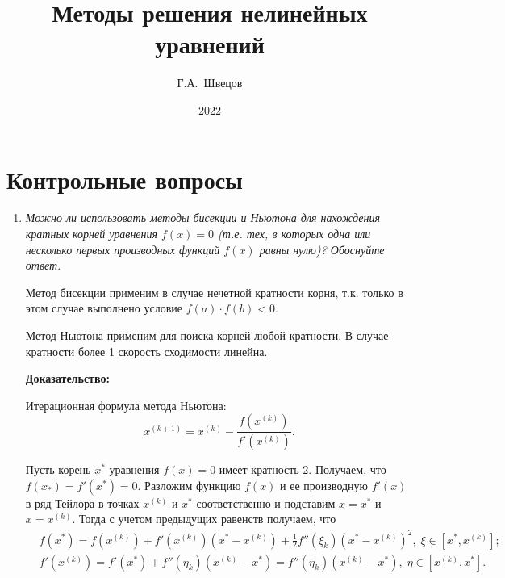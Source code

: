 \documentclass[12pt, a4paper]{article}
\title{Методы решения нелинейных уравнений}
\author{Г.А.~Швецов}
\date{2022}
\begin{document}
	\newcommand{\pl}{\partial}
	\maketitle
	
	\tableofcontents
	
	\newpage
	
	\section{Контрольные вопросы}
	\begin{enumerate}
		\item \textit{Можно ли использовать методы бисекции и Ньютона для нахождения кратных корней уравнения $f (x) = 0$ (т.е. тех, в которых одна или несколько первых производных функций $f (x)$ равны нулю)? Обоснуйте ответ.}
		\smallskip
		
		Метод бисекции применим в случае нечетной кратности корня, т.к. только в этом случае выполнено условие $f(a) \cdot f(b)<0$.
				
			Метод Ньютона применим для поиска корней любой кратности. В случае кратности более 1 скорость сходимости линейна.
		
		\textbf{Доказательство:}
		
		Итерационная формула метода Ньютона:
	\begin{equation}
		\label{Newton}
		x^{(k+1)} = x^{(k)} - \dfrac{f(x^{(k)})}{f'(x^{(k)})}.
	\end{equation}
	
	Пусть корень $x^*$ уравнения $f(x)=0$ имеет кратность 2. Получаем, что $f(x_*) = f'(x^*) = 0$. Разложим функцию $f(x)$ и ее производную $f'(x)$ в ряд Тейлора в точках $x^{(k)}$ и $x^*$ соответственно и подставим $x = x^*$ и $x = x^{(k)}$. Тогда с учетом предыдущих равенств получаем, что
	\begin{eqnarray}
		\label{eq1}
		& f(x^*) = f(x^{(k)}) + f'(x^{(k)}) (x^*-x^{(k)}) + \frac12 f''(\xi_k) (x^*-x^{(k)})^2,\; \xi \in [x^*, x^{(k)}]; \\
		\label{eq2}
		& f'(x^{(k)}) = f'(x^*) + f''(\eta_k) (x^{(k)}-x^*) = f''(\eta_k) (x^{(k)}-x^*), \; \eta \in [x^{(k)}, x^*].
	\end{eqnarray}
	

\end{enumerate}
\end{document}
